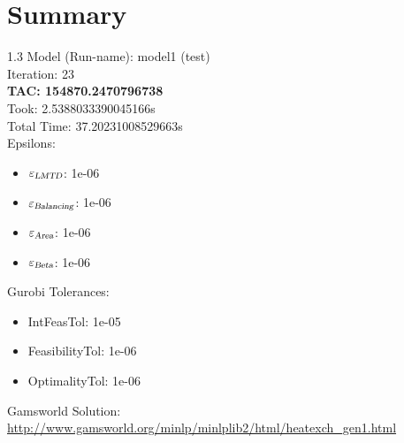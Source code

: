 \documentclass{article}%
\begin{document}
%
\normalsize%
\section{Summary}%
\thispagestyle{plain}%
\begin{spacing}{1.3}%
\Large%
Model (Run-name): model1 (test)\\%
Iteration: 23\\%
\textbf{TAC: 154870.2470796738}\\%
Took: 2.5388033390045166s\\%
Total Time: 37.20231008529663s\\%
Epsilons:%
\begin{itemize}%
	\item $\varepsilon_{\textsl{LMTD}}$: 1e-06%
	\item $\varepsilon_{\textsl{Balancing}}$: 1e-06%
	\item $\varepsilon_{\textsl{Area}}$: 1e-06%
	\item $\varepsilon_{\textsl{Beta}}$: 1e-06%
\end{itemize}%
Gurobi Tolerances:%
\begin{itemize}%
	\item IntFeasTol: 1e-05%
	\item FeasibilityTol: 1e-06%
	\item OptimalityTol: 1e-06%
\end{itemize}%
\end{spacing}%
\normalsize%
Gamsworld Solution: \url{http://www.gamsworld.org/minlp/minlplib2/html/heatexch_gen1.html}%
%
\clearpage%
\end{document}
